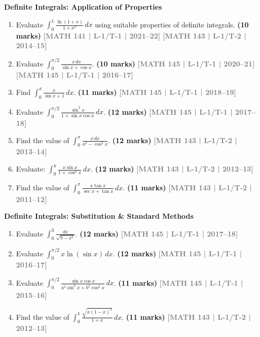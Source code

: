 \documentclass[12pt,a3paper]{article}
\newcommand{\yr}[1]{\hfill\textcolor{gray}{\small\textbf{[#1]}}}
\newcommand{\mk}[1]{\textcolor{orange!70!black}{\small\textbf{(#1 marks)}}}
\newcommand{\subtopic}[2]{%
  \vspace{10pt}
  \noindent\begin{tcolorbox}[colback=#1!8,colframe=#1,boxrule=0.6pt,arc=4pt,
    left=6pt,right=6pt,top=4pt,bottom=4pt]
    \small\bfseries\textcolor{#1}{#2}
  \end{tcolorbox}
  \vspace{2pt}
}
\begin{document}
\subtopic{cB}{Definite Integrals: Application of Properties}
\label{sub:s2-definite-properties}

\begin{enumerate}

\item Evaluate $\displaystyle\int_{0}^{1}\frac{\ln(1+x)}{1+x^{2}}\,dx$ using suitable properties of definite integrals.
\mk{10} \yr{MATH 141 | L-1/T-1 | 2021--22} \yr{MATH 143 | L-1/T-2 | 2014--15}

\item Evaluate $\displaystyle\int_{0}^{\pi/2}\frac{x\,dx}{\sin x+\cos x}$.
\mk{10} \yr{MATH 145 | L-1/T-1 | 2020--21} \yr{MATH 145 | L-1/T-1 | 2016--17}

\item Find $\displaystyle\int_{0}^{\pi}\frac{x}{\sin x+1}\,dx$.
\mk{11} \yr{MATH 145 | L-1/T-1 | 2018--19}

\item Evaluate $\displaystyle\int_{0}^{\pi/2}\frac{\sin^{2}x}{1+\sin x\cos x}\,dx$.
\mk{12} \yr{MATH 145 | L-1/T-1 | 2017--18}

\item Find the value of $\displaystyle\int_{0}^{\pi}\frac{x\,dx}{a^{2}-\cos^{2}x}$.
\mk{12\textonehalf} \yr{MATH 143 | L-1/T-2 | 2013--14}

\item Evaluate: $\displaystyle\int_{0}^{\pi}\frac{x\sin x}{1+\cos^{2}x}\,dx$.
\mk{12\textonehalf} \yr{MATH 143 | L-1/T-2 | 2012--13}

\item Find the value of $\displaystyle\int_{0}^{\pi}\frac{x\tan x}{\sec x+\tan x}\,dx$.
\mk{11\textonehalf} \yr{MATH 143 | L-1/T-2 | 2011--12}

\end{enumerate}


\subtopic{cB}{Definite Integrals: Substitution \& Standard Methods}
\label{sub:s2-definite-standard}

\begin{enumerate}

\item Evaluate $\displaystyle\int_{0}^{3}\frac{dx}{\sqrt{9-x^{2}}}$.
\mk{12} \yr{MATH 145 | L-1/T-1 | 2017--18}

\item Evaluate $\displaystyle\int_{0}^{\pi/2}x\ln(\sin x)\,dx$.
\mk{12} \yr{MATH 145 | L-1/T-1 | 2016--17}

\item Evaluate $\displaystyle\int_{0}^{\pi/2}\frac{\sin x\cos x}{a^{2}\sin^{2}x+b^{2}\cos^{2}x}\,dx$.
\mk{11} \yr{MATH 145 | L-1/T-1 | 2015--16}

\item Find the value of $\displaystyle\int_{0}^{1}\frac{\sqrt{x(1-x)^{2}}}{1+x}\,dx$.
\mk{11} \yr{MATH 143 | L-1/T-2 | 2012--13}

\end{enumerate}
\end{document}
